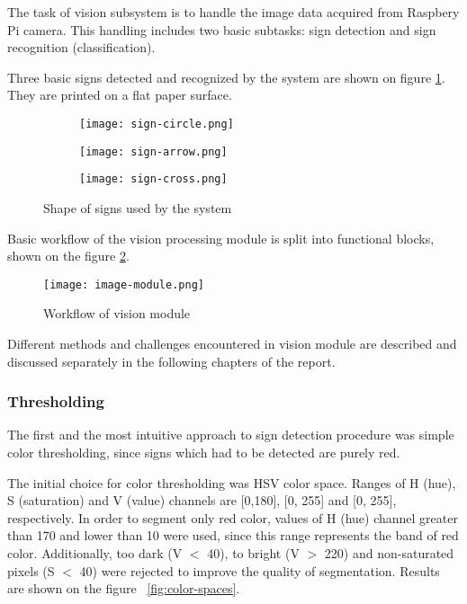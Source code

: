 
The task of vision subsystem is to handle the image data acquired from Raspbery Pi camera. This handling includes two basic subtasks: sign detection and sign recognition (classification).

Three basic signs detected and recognized by the system are shown on figure \ref{fig:raw-signs}. They are printed on a flat paper surface.

\begin{figure}[th!]
	\centering
	\begin{subfigure}[b]{0.2\textwidth}
		\centering
		\texttt{[image: sign-circle.png]}
	\end{subfigure}
	\begin{subfigure}[b]{0.4\textwidth}
		\centering
		\texttt{[image: sign-arrow.png]}
	\end{subfigure}
	\begin{subfigure}[b]{0.2\textwidth}
		\centering
		\texttt{[image: sign-cross.png]}
	\end{subfigure}
	\caption{Shape of signs used by the system}
	\label{fig:raw-signs}
\end{figure}

Basic workflow of the vision processing module is split into functional blocks, shown on the figure \ref{fig:vision-module-blocks}.

\begin{figure}[th!]
	\centering
		\texttt{[image: image-module.png]}
	\caption{Workflow of vision module}
	\label{fig:vision-module-blocks}
\end{figure}

Different methods and challenges encountered in vision module are described and discussed separately in the following chapters of the report.

\subsubsection{Thresholding}

The first and the most intuitive approach to sign detection procedure was simple color thresholding, since signs which had to be detected are purely red.

The initial choice for color thresholding was HSV color space. Ranges of H (hue), S (saturation) and V (value) channels are [0,180], [0, 255] and [0, 255], respectively. In order to segment only red color, values of H (hue) channel greater than 170 and lower than 10 were used, since this range represents the band of red color. Additionally, too dark (V $ < $ 40), to bright (V $ > $ 220) and non-saturated pixels (S $ < $ 40) were rejected to improve the quality of segmentation. Results are shown on the figure ~\ref{fig:color-spaces}.

